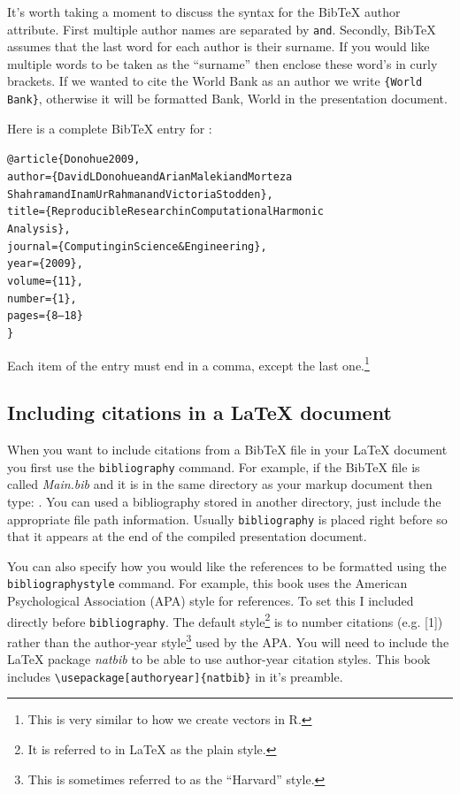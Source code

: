 It's worth taking a moment to discuss the syntax for the BibTeX author attribute. First multiple author names are separated by \texttt{and}. Secondly, BibTeX assumes that the last word for each author is their surname. If you would like multiple words to be taken as the ``surname'' then enclose these word's in curly brackets. If we wanted to cite the World Bank as an author we write \verb|{World Bank}|, otherwise it will be formatted Bank, World in the presentation document.

Here is a complete BibTeX entry for \cite{Donohue2009}:

\begin{knitrout}
    \color{fgcolor}
    \begin{kframe}
        \begin{alltt}
@article\{Donohue2009,
  author = \{David L Donohue and Arian Maleki and Morteza 
  Shahram and Inam Ur Rahman and Victoria Stodden\},
  title = \{Reproducible Research in Computational Harmonic 
  Analysis\},
  journal = \{Computing in Science \& Engineering\},
  year = \{2009\},
  volume = \{11\},
  number = \{1\},
  pages = \{8--18\}
\}
        \end{alltt}
\end{kframe}
\end{knitrout}

\noindent Each item of the entry must end in a comma, except the last one.\footnote{This is very similar to how we create vectors in R.} 

\subsection{Including citations in a LaTeX document}

When you want to include citations from a BibTeX file in your LaTeX document you first use the \texttt{bibliography} command. For example, if the BibTeX file is called \emph{Main.bib} and it is in the same directory as your markup document then type: \verb||. You can used a bibliography stored in another directory, just include the appropriate file path information. Usually \texttt{bibliography} is placed right before \verb|| so that it appears at the end of the compiled presentation document.

You can also specify how you would like the references to be formatted using the \texttt{bibliographystyle} command. For example, this book uses the American Psychological Association (APA) style for references. To set this I included \verb|| directly before \texttt{bibliography}. The default style\footnote{It is referred to in LaTeX as the plain style.} is to number citations (e.g. [1]) rather than the author-year style\footnote{This is sometimes referred to as the ``Harvard'' style.} used by the APA. You will need to include the LaTeX package \emph{natbib} to be able to use author-year citation styles. This book includes \verb|\usepackage[authoryear]{natbib}| in it's preamble.

